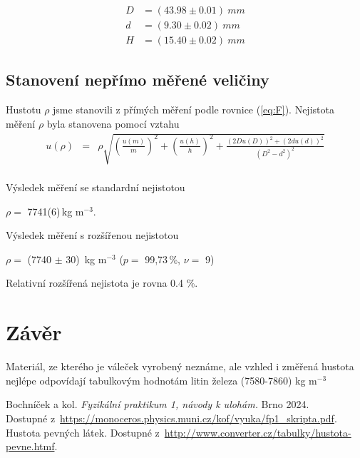 \documentclass[a4paper,11pt]{article}
\newcommand{\vsn}[4]{\ensuremath{#1 =} #2(#3)\,#4}
\newcommand{\vrn}[6]{\ensuremath{#1 =} (#2 $\pm$ #3)\,#4 ($p=$ #5\,\%, $\nu=$ #6)}
\begin{document}
\begin{align}
  D &= (43.98 \pm 0.01)\  mm\\
  d &= (9.30 \pm 0.02)\ mm \\
  H &= (15.40 \pm 0.02)\ mm
\end{align}

\subsection{Stanovení nepřímo měřené veličiny}
Hustotu $\rho$ jsme stanovili z přímých měření podle rovnice (\ref{eq:F}). 
Nejistota měření $\rho$ byla stanovena pomocí vztahu
\begin{eqnarray}
  u(\rho) &=& \rho \sqrt{(\frac{u(m)}{m})^2 + (\frac{u(h)}{h})^2 + \frac{(2Du(D))^2 + (2du(d))^2 }{(D^2-d^2)^2}} \\
\end{eqnarray}

Výsledek měření se standardní nejistotou

\begin{center}
\vsn{\rho}{7741}{6}{kg m$^{-3}$}.
\end{center}

Výsledek měření s rozšířenou nejistotou

\begin{center}
  \vrn{\rho}{7740}{30}{ kg m$^{-3}$ }{99,73}{9}
\end{center}
Relativní rozšířená nejistota je rovna 0.4 \%.

\section{Závěr}
Materiál, ze kterého je váleček vyrobený neznáme, ale vzhled i změřená hustota nejlépe odpovídají 
tabulkovým hodnotám litin železa (7580-7860) kg m$^{-3}$


\begin{thebibliography}{0}
 Bochníček a kol. \textit{Fyzikální praktikum 1, návody k ulohám.} Brno 2024.\\ Dostupné z~\url{https://monoceros.physics.muni.cz/kof/vyuka/fp1_skripta.pdf}.   
 Hustota pevných látek. Dostupné z~\url{http://www.converter.cz/tabulky/hustota-pevne.htmf}.   

\end{thebibliography}


\end{document}
